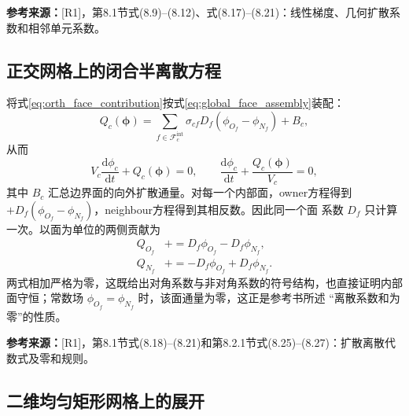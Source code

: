 \documentclass[UTF8,12pt,a4paper]{ctexart}
\numberwithin{equation}{section}
\newcommand{\Rone}{\textnormal{[R1]}}
\newcommand{\source}[1]{%
  \par\smallskip
  \noindent\colorbox{sourcebg}{%
    \parbox{0.955\linewidth}{\raggedright\footnotesize\color{sourcegray}\textbf{参考来源：}#1}%
  }
  \par\smallskip
}
\begin{document}
\source{\Rone，第8.1节式(8.9)--(8.12)、式(8.17)--(8.21)：线性梯度、几何扩散系数和相邻单元系数。}

\subsection{正交网格上的闭合半离散方程}

将式\eqref{eq:orth_face_contribution}按式\eqref{eq:global_face_assembly}装配：
\begin{equation}
  \boxed{
  Q_c(\bm\phi)
  =\sum_{f\in\mathcal F_c^{\mathrm{int}}}
  \sigma_{cf}D_f(\phi_{O_f}-\phi_{N_f})+B_c,}
  \label{eq:orth_Q}
\end{equation}
从而
\begin{equation}
  \boxed{
  V_c\frac{\mathrm d\phi_c}{\mathrm dt}+Q_c(\bm\phi)=0,
  \qquad
  \frac{\mathrm d\phi_c}{\mathrm dt}+\frac{Q_c(\bm\phi)}{V_c}=0,}
  \label{eq:orth_semidiscrete}
\end{equation}
其中 $B_c$ 汇总边界面的向外扩散通量。对每一个内部面，owner方程得到
$+D_f(\phi_{O_f}-\phi_{N_f})$，neighbour方程得到其相反数。因此同一个面
系数 $D_f$ 只计算一次。以面为单位的两侧贡献为
\begin{equation}
  \begin{aligned}
  Q_{O_f}&\mathrel{+}=D_f\phi_{O_f}-D_f\phi_{N_f},\\
  Q_{N_f}&\mathrel{+}=-D_f\phi_{O_f}+D_f\phi_{N_f}.
  \end{aligned}
  \label{eq:orth_expanded}
\end{equation}
两式相加严格为零，这既给出对角系数与非对角系数的符号结构，也直接证明内部
面守恒；常数场 $\phi_{O_f}=\phi_{N_f}$ 时，该面通量为零，这正是参考书所述
“离散系数和为零”的性质。

\source{\Rone，第8.1节式(8.18)--(8.21)和第8.2.1节式(8.25)--(8.27)：扩散离散代数式及零和规则。}

\subsection{二维均匀矩形网格上的展开}
\end{document}
